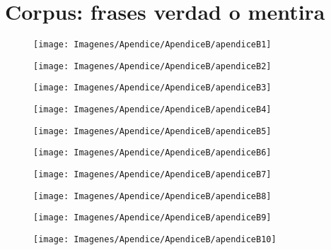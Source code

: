 \chapter{Corpus: frases verdad o mentira}
\label{Appendix:Key2}

\begin{figure}[h]
  \centering
\texttt{[image: Imagenes/Apendice/ApendiceB/apendiceB1]}
\end{figure}

\begin{figure}[h]
  \centering
\texttt{[image: Imagenes/Apendice/ApendiceB/apendiceB2]}
\end{figure}

\begin{figure}[h]
  \centering
\texttt{[image: Imagenes/Apendice/ApendiceB/apendiceB3]}
\end{figure}

\begin{figure}[h]
  \centering
\texttt{[image: Imagenes/Apendice/ApendiceB/apendiceB4]}
\end{figure}

\begin{figure}[h]
  \centering
\texttt{[image: Imagenes/Apendice/ApendiceB/apendiceB5]}
\end{figure}

\begin{figure}[h]
  \centering
\texttt{[image: Imagenes/Apendice/ApendiceB/apendiceB6]}
\end{figure}

\begin{figure}[h]
  \centering
\texttt{[image: Imagenes/Apendice/ApendiceB/apendiceB7]}
\end{figure}

\begin{figure}[h]
  \centering
\texttt{[image: Imagenes/Apendice/ApendiceB/apendiceB8]}
\end{figure}

\begin{figure}[h]
  \centering
\texttt{[image: Imagenes/Apendice/ApendiceB/apendiceB9]}
\end{figure}

\begin{figure}[h]
  \centering
\texttt{[image: Imagenes/Apendice/ApendiceB/apendiceB10]}
\end{figure}

